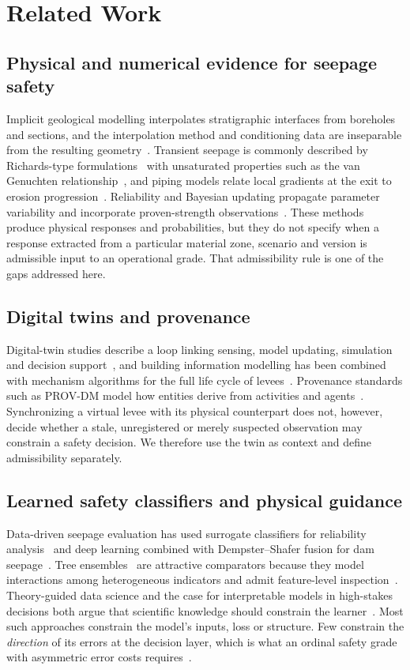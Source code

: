 \documentclass[journal]{IEEEtran}
\begin{document}
\section{Related Work}
\label{sec:related}
\subsection{Physical and numerical evidence for seepage safety}
Implicit geological modelling interpolates stratigraphic interfaces from boreholes and sections, and the interpolation method and conditioning data are inseparable from the resulting geometry~\cite{Wellmann2018,GemPy}. Transient seepage is commonly described by Richards-type formulations~\cite{Richards,Celia1990} with unsaturated properties such as the van Genuchten relationship~\cite{vanGenuchten1980}, and piping models relate local gradients at the exit to erosion progression~\cite{vanBeek2015}. Reliability and Bayesian updating propagate parameter variability and incorporate proven-strength observations~\cite{Schweckendiek,Roscoe,Baecher2003,Xu}. These methods produce physical responses and probabilities, but they do not specify when a response extracted from a particular material zone, scenario and version is admissible input to an operational grade. That admissibility rule is one of the gaps addressed here.

\subsection{Digital twins and provenance}
Digital-twin studies describe a loop linking sensing, model updating, simulation and decision support~\cite{Fuller2020}, and building information modelling has been combined with mechanism algorithms for the full life cycle of levees~\cite{Hou}. Provenance standards such as PROV-DM model how entities derive from activities and agents~\cite{PROVDM}. Synchronizing a virtual levee with its physical counterpart does not, however, decide whether a stale, unregistered or merely suspected observation may constrain a safety decision. We therefore use the twin as context and define admissibility separately.

\subsection{Learned safety classifiers and physical guidance}
Data-driven seepage evaluation has used surrogate classifiers for reliability analysis~\cite{Xu} and deep learning combined with Dempster--Shafer fusion for dam seepage~\cite{Chen}. Tree ensembles~\cite{Quinlan,Breiman,Hastie2009} are attractive comparators because they model interactions among heterogeneous indicators and admit feature-level inspection~\cite{LundbergLee}. Theory-guided data science and the case for interpretable models in high-stakes decisions both argue that scientific knowledge should constrain the learner~\cite{Karpatne2017,Rudin2019}. Most such approaches constrain the model's inputs, loss or structure. Few constrain the \emph{direction} of its errors at the decision layer, which is what an ordinal safety grade with asymmetric error costs requires~\cite{Elkan2001}.
\end{document}
